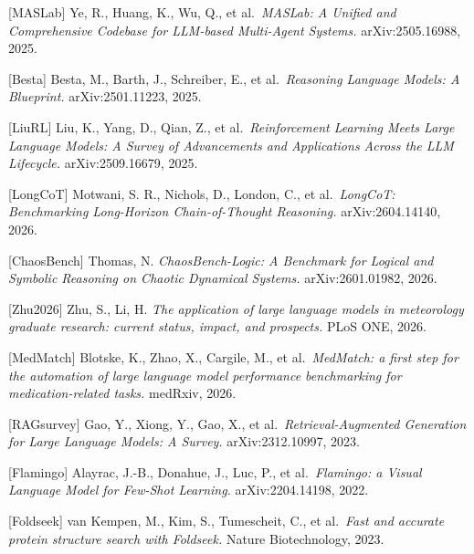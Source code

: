 {[}MASLab{]} Ye, R., Huang, K., Wu, Q., et al.~\emph{MASLab: A Unified and Comprehensive Codebase for LLM-based Multi-Agent Systems.} arXiv:2505.16988, 2025.

{[}Besta{]} Besta, M., Barth, J., Schreiber, E., et al.~\emph{Reasoning Language Models: A Blueprint.} arXiv:2501.11223, 2025.

{[}LiuRL{]} Liu, K., Yang, D., Qian, Z., et al.~\emph{Reinforcement Learning Meets Large Language Models: A Survey of Advancements and Applications Across the LLM Lifecycle.} arXiv:2509.16679, 2025.

{[}LongCoT{]} Motwani, S. R., Nichols, D., London, C., et al.~\emph{LongCoT: Benchmarking Long-Horizon Chain-of-Thought Reasoning.} arXiv:2604.14140, 2026.

{[}ChaosBench{]} Thomas, N. \emph{ChaosBench-Logic: A Benchmark for Logical and Symbolic Reasoning on Chaotic Dynamical Systems.} arXiv:2601.01982, 2026.

{[}Zhu2026{]} Zhu, S., Li, H. \emph{The application of large language models in meteorology graduate research: current status, impact, and prospects.} PLoS ONE, 2026.

{[}MedMatch{]} Blotske, K., Zhao, X., Cargile, M., et al.~\emph{MedMatch: a first step for the automation of large language model performance benchmarking for medication-related tasks.} medRxiv, 2026.

{[}RAGsurvey{]} Gao, Y., Xiong, Y., Gao, X., et al.~\emph{Retrieval-Augmented Generation for Large Language Models: A Survey.} arXiv:2312.10997, 2023.

{[}Flamingo{]} Alayrac, J.-B., Donahue, J., Luc, P., et al.~\emph{Flamingo: a Visual Language Model for Few-Shot Learning.} arXiv:2204.14198, 2022.

{[}Foldseek{]} van Kempen, M., Kim, S., Tumescheit, C., et al.~\emph{Fast and accurate protein structure search with Foldseek.} Nature Biotechnology, 2023.
